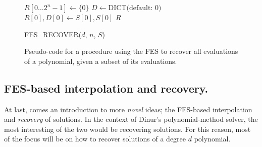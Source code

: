 \begin{figure}[th!]
    \begin{alg}
        $R[0\dots 2^n - 1] \gets \{0\}$\;
        $D \gets \text{DICT(default: 0)}$\;
        $R[0], D[0] \gets S[0], S[0]$\;
        \Return $R$\;
        \caption{FES\_RECOVER($d$, $n$, $S$)} \label{alg:fes_recover}
    \end{alg}
    \caption{Pseudo-code for a procedure using the FES to recover all evaluations of a polynomial, given a subset of its evaluations.}
\end{figure}

\subsection{FES-based interpolation and recovery.} \label{sec:ext:fes_interp:interp_recover}

At last, comes an introduction to more \textit{novel} ideas; the FES-based interpolation and \textit{recovery} of solutions. In the context of Dinur's polynomial-method solver, the most interesting of the two would be recovering solutions. For this reason, most of the focus will be on how to recover solutions of a degree $d$ polynomial.

